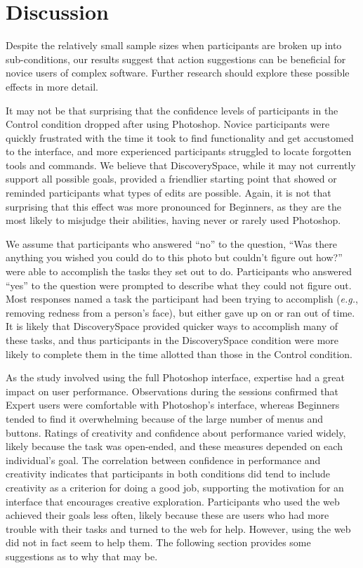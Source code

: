 \section{Discussion}
Despite the relatively small sample sizes when participants are broken up into sub-conditions, our results suggest that action suggestions can be beneficial for novice users of complex software. Further research should explore these possible effects in more detail.

It may not be that surprising that the confidence levels of participants in the Control condition dropped after using Photoshop. Novice participants were quickly frustrated with the time it took to find functionality and get accustomed to the interface, and more experienced participants struggled to locate forgotten tools and commands. We believe that Discovery\-Space, while it may not currently support all possible goals, provided a friendlier starting point that showed or reminded participants what types of edits are possible. Again, it is not that surprising that this effect was more pronounced for Beginners, as they are the most likely to misjudge their abilities, having never or rarely used Photoshop.

We assume that participants who answered ``no'' to the question, ``Was there anything you wished you could do to this photo but couldn't figure out how?'' were able to accomplish the tasks they set out to do. Participants who answered ``yes'' to the question were prompted to describe what they could not figure out. Most responses named a task the participant had been trying to accomplish (\textit{e.g.}, removing redness from a person's face), but either gave up on or ran out of time. It is likely that Discovery\-Space provided quicker ways to accomplish many of these tasks, and thus participants in the Discovery\-Space condition were more likely to complete them in the time allotted than those in the Control condition. 

As the study involved using the full Photoshop interface, expertise had a great impact on user performance. Observations during the sessions confirmed that Expert users were comfortable with Photoshop's interface, whereas Beginners tended to find it overwhelming because of the large number of menus and buttons. Ratings of creativity and confidence about performance varied widely, likely because the task was open-ended, and these measures depended on each individual's goal. 
The correlation between confidence in performance and creativity indicates that participants in both conditions did tend to include creativity as a criterion for doing a good job, supporting the motivation for an interface that encourages creative exploration. Participants who used the web achieved their goals less often, likely because these are users who had more trouble with their tasks and turned to the web for help. However, using the web did not in fact seem to help them. The following section provides some suggestions as to why that may be.

